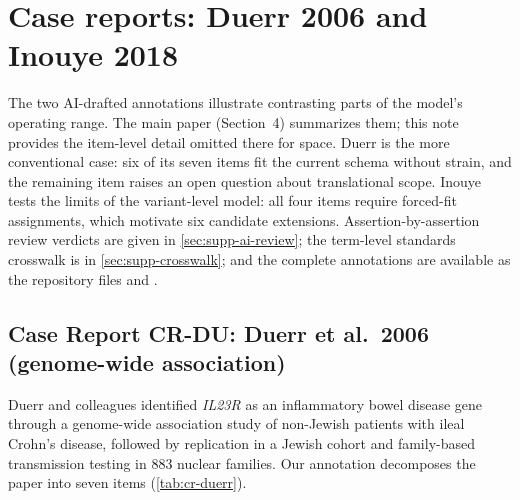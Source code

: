 %
\section{Case reports: Duerr 2006 and Inouye 2018}
\label{sec:supp-crep}

The two AI-drafted annotations illustrate contrasting parts of the model's
operating range. The main paper (Section~4) summarizes them; this
note provides the item-level detail omitted there for space.
Duerr is the more conventional case: six of its seven \GeneticEvidence{}
items fit the current schema without strain, and the remaining item raises
an open question about translational scope. Inouye tests the limits of the variant-level model: all four items
require forced-fit assignments, which motivate six candidate extensions.
Assertion-by-assertion review verdicts are given in
\cref{sec:supp-ai-review}; the term-level standards crosswalk is in
\cref{sec:supp-crosswalk}; and the complete annotations are available as
the repository files  and
.

\subsection{Case Report CR-DU: Duerr et al.\ 2006 (genome-wide association)}
\label{sec:supp-ex-duerr}

Duerr and colleagues identified \textit{IL23R} as an inflammatory bowel
disease gene through a genome-wide association study of non-Jewish patients
with ileal Crohn's disease, followed by replication in a Jewish cohort and
family-based transmission testing in 883 nuclear families. Our annotation
decomposes the paper into seven \GeneticEvidence{} items
(\cref{tab:cr-duerr}).

